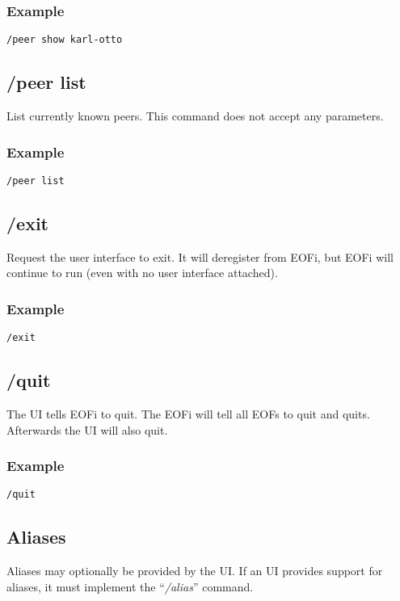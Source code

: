 \documentclass[12pt,a4paper]{book}
\begin{document}
\subsubsection{Example}
\begin{verbatim}
/peer show karl-otto
\end{verbatim}
\subsection{/peer list}
List currently known peers. This command does not accept any parameters.

\subsubsection{Example}
\begin{verbatim}
/peer list
\end{verbatim}
\subsection{/exit}
Request the user interface to exit. It will deregister from EOFi,
but EOFi will continue to run (even with no user interface attached).
\subsubsection{Example}
\begin{verbatim}
/exit
\end{verbatim}
\subsection{/quit}
The UI tells EOFi to quit.
The EOFi will tell all EOFs to quit and quits.
Afterwards the UI will also quit.
\subsubsection{Example}
\begin{verbatim}
/quit
\end{verbatim}
\subsection{Aliases}
Aliases may optionally be provided by the UI. If an UI provides
support for aliases, it must implement the "`\emph{/alias}"' command.
\end{document}
